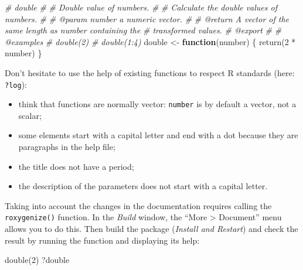 \documentclass[
  12pt,
  american,
  a4paper,
  extrafontsizes,onecolumn,openright
  ]{memoir}
\newenvironment{Shaded}{\begin{snugshade}}{\end{snugshade}}
\newcommand{\CommentTok}[1]{\textcolor[rgb]{0.56,0.35,0.01}{\textit{#1}}}
\newcommand{\ControlFlowTok}[1]{\textcolor[rgb]{0.13,0.29,0.53}{\textbf{#1}}}
\newcommand{\DecValTok}[1]{\textcolor[rgb]{0.00,0.00,0.81}{#1}}
\newcommand{\FunctionTok}[1]{\textcolor[rgb]{0.00,0.00,0.00}{#1}}
\newcommand{\NormalTok}[1]{#1}
\newcommand{\OtherTok}[1]{\textcolor[rgb]{0.56,0.35,0.01}{#1}}
\newcommand{\SpecialCharTok}[1]{\textcolor[rgb]{0.00,0.00,0.00}{#1}}
\providecommand{\tightlist}{%
  \setlength{\itemsep}{0pt}\setlength{\parskip}{0pt}}
\begin{document}
\begin{Shaded}
\begin{Highlighting}[]
\CommentTok{\#\textquotesingle{} double}
\CommentTok{\#\textquotesingle{} }
\CommentTok{\#\textquotesingle{} Double value of numbers.}
\CommentTok{\#\textquotesingle{}}
\CommentTok{\#\textquotesingle{} Calculate the double values of numbers.}
\CommentTok{\#\textquotesingle{} }
\CommentTok{\#\textquotesingle{} @param number a numeric vector.}
\CommentTok{\#\textquotesingle{}}
\CommentTok{\#\textquotesingle{} @return A vector of the same length as \textasciigrave{}number\textasciigrave{} containing the }
\CommentTok{\#\textquotesingle{}   transformed values.}
\CommentTok{\#\textquotesingle{} @export}
\CommentTok{\#\textquotesingle{}}
\CommentTok{\#\textquotesingle{} @examples}
\CommentTok{\#\textquotesingle{} double(2)}
\CommentTok{\#\textquotesingle{} double(1:4)}
\NormalTok{double }\OtherTok{\textless{}{-}} \ControlFlowTok{function}\NormalTok{(number) \{}
    \FunctionTok{return}\NormalTok{(}\DecValTok{2} \SpecialCharTok{*}\NormalTok{ number)}
\NormalTok{\}}
\end{Highlighting}
\end{Shaded}

\normalsize

Don't hesitate to use the help of existing functions to respect R standards (here: \texttt{?log}):

\begin{itemize}
\tightlist
\item
  think that functions are normally vector: \texttt{number} is by default a vector, not a scalar;
\item
  some elements start with a capital letter and end with a dot because they are paragraphs in the help file;
\item
  the title does not have a period;
\item
  the description of the parameters does not start with a capital letter.
\end{itemize}

Taking into account the changes in the documentation requires calling the \texttt{roxygenize()} function.
In the \emph{Build} window, the \enquote{More \textgreater{} Document} menu allows you to do this.
Then build the package (\emph{Install and Restart}) and check the result by running the function and displaying its help:

\scriptsize

\begin{Shaded}
\begin{Highlighting}[]
\FunctionTok{double}\NormalTok{(}\DecValTok{2}\NormalTok{)}
\NormalTok{?double}
\end{Highlighting}
\end{Shaded}
\end{document}

